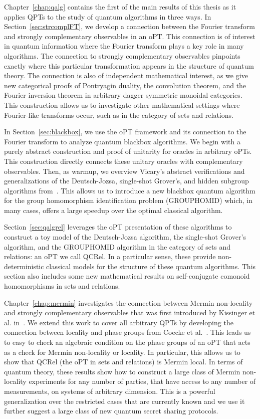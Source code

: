 Chapter~\ref{chap:qalg} contains the first of the main results of this thesis as it applies QPTs to the study of quantum algorithms in three ways.  In Section~\ref{sec:strcomplFT}, we develop a connection between the Fourier transform and strongly complementary observables in an oPT.  This connection is of interest in quantum information where the Fourier transform plays a key role in many algorithms.  The connection to strongly complementary observables pinpoints exactly where this particular transformation appears in the structure of quantum theory.  The connection is also of independent mathematical interest, as we give new categorical proofs of Pontryagin duality, the convolution theorem, and the Fourier inversion theorem in arbitrary dagger symmetric monoidal categories. This construction allows us to investigate other mathematical settings where Fourier-like transforms occur, such as in the category of sets and relations.

In Section~\ref{sec:blackbox}, we use the oPT framework and its connection to the Fourier transform to analyze quantum blackbox algorithms.  We begin with a purely abstract construction and proof of unitarity for oracles in arbitrary oPTs. This construction directly connects these unitary oracles with complementary observables. Then, as warmup, we overview Vicary's abstract verifications and generalizations  of the Deutsch-Jozsa, single-shot Grover's, and hidden subgroup algorithms from~\cite{vicary-tqa}.  This allows us to introduce a new blackbox quantum algorithm for the group homomorphism identification problem (GROUPHOMID) which, in many cases, offers a large speedup over the optimal classical algorithm.

Section~\ref{sec:qalgrel} leverages the oPT presentation of these algorithms to construct a toy model of the Deutsch-Jozsa algorithm, the single-shot Grover's algorithm, and the GROUPHOMID algorithm in the category of sets and relations: an oPT we call QCRel. In a particular sense, these provide non-deterministic classical models for the structure of these quantum algorithms. This section also includes some new mathematical results on self-conjugate comonoid homomorphisms in sets and relations.

Chapter~\ref{chap:mermin} investigates the connection between Mermin non-locality and strongly complementary observables that was first introduced by Kissinger et al. in~\cite{coecke2012strong}. We extend this work to cover all arbitrary QPTs by developing the connection between locality and phase groups from Coecke et al.~\cite{coecke2011phase}. This leads us to easy to check an algebraic condition on the phase groups of an oPT that acts as a check for Mermin non-locality or locality. In particular, this allows us to show that QCRel (the oPT in sets and relations) is Mermin local. In terms of quantum theory, these results show how to construct a large class of Mermin non-locality experiments for any number of parties, that have access to any number of measurements, on systems of arbitrary dimension.  This is a powerful generalization over the restricted cases that are currently known and we use it further suggest a large class of new quantum secret sharing protocols.

